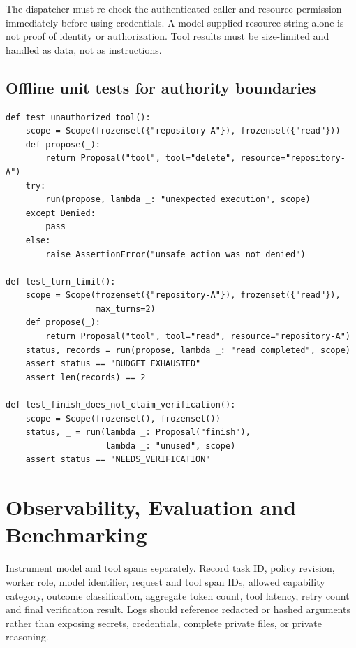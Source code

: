 The dispatcher must re-check the authenticated caller and resource permission immediately before using credentials. A model-supplied resource string alone is not proof of identity or authorization. Tool results must be size-limited and handled as data, not as instructions.

\subsection{Offline unit tests for authority boundaries}
\begin{verbatim}
def test_unauthorized_tool():
    scope = Scope(frozenset({"repository-A"}), frozenset({"read"}))
    def propose(_):
        return Proposal("tool", tool="delete", resource="repository-A")
    try:
        run(propose, lambda _: "unexpected execution", scope)
    except Denied:
        pass
    else:
        raise AssertionError("unsafe action was not denied")

def test_turn_limit():
    scope = Scope(frozenset({"repository-A"}), frozenset({"read"}),
                  max_turns=2)
    def propose(_):
        return Proposal("tool", tool="read", resource="repository-A")
    status, records = run(propose, lambda _: "read completed", scope)
    assert status == "BUDGET_EXHAUSTED"
    assert len(records) == 2

def test_finish_does_not_claim_verification():
    scope = Scope(frozenset(), frozenset())
    status, _ = run(lambda _: Proposal("finish"),
                    lambda _: "unused", scope)
    assert status == "NEEDS_VERIFICATION"
\end{verbatim}

\section{Observability, Evaluation and Benchmarking}
Instrument model and tool spans separately. Record task ID, policy revision, worker role, model identifier, request and tool span IDs, allowed capability category, outcome classification, aggregate token count, tool latency, retry count and final verification result. Logs should reference redacted or hashed arguments rather than exposing secrets, credentials, complete private files, or private reasoning.

